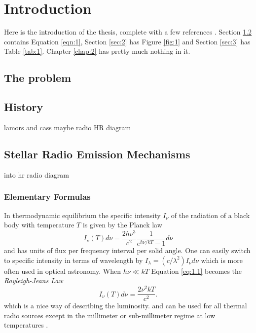 \chapter{Introduction}
\label{chap:1}


\label{chap:1}
 
 
Here is the introduction of the thesis, complete with a few references  \citep{sagan1997demon, prothero2007evolution}.  Section \ref{sec:1} contains Equation \ref{eqn:1}, Section \ref{sec:2} has Figure \ref{fig:1} and Section \ref{sec:3} has Table \ref{tab:1}. Chapter \ref{chap:2} has pretty much nothing in it.
\pagebreak
\section{The problem}\label{sec:1}
\section{History}\label{sec:1}
lamors and cass
maybe radio HR diagram
\section{Stellar Radio Emission Mechanisms}\label{sec:3.1}
 
into hr radio diagram
 
\subsection{Elementary Formulas}\label{subsec:3.1.1}
In thermodynamic equilibrium the specific intensity $I_{\nu}$ of the radiation of a black body with temperature $T$ is given by the Planck law
\begin{equation}\label{eq:1.1}
I_{\nu}(T)d\nu=\frac{2h\nu ^3}{c^2}\frac{1}{e^{h\nu /kT}-1}d\nu
\end{equation}
and has units of flux per frequency interval per solid angle. One can easily switch to specific intensity in terms of wavelength by $I_{\lambda}=(c/\lambda ^2)I_{\nu}d\nu$ which is more often used in optical astronomy. When $h\nu \ll kT$ Equation \ref{eq:1.1} becomes the \textit{Rayleigh-Jeans Law}
\begin{equation}
\label{eqn:1}
I_{\nu}(T)d\nu=\dfrac{2\nu ^2kT}{c^2}.
\end{equation}
which is a nice way of describing the luminosity. 
and can be used for all thermal radio sources except in the millimeter or sub-millimeter regime at low temperatures \citep{rohlfs_1996}.
 
